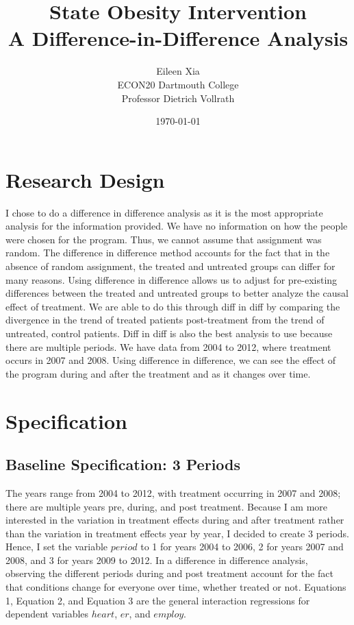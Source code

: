 \documentclass[a4paper]{article}
\title{State Obesity Intervention \\
A Difference-in-Difference Analysis}
\author{Eileen Xia \\ ECON20 Dartmouth College \\ Professor Dietrich Vollrath}
\date{\today}
\begin{document}
\maketitle

\section{Research Design}
I chose to do a difference in difference analysis as it is the most appropriate analysis for the information provided. We have no information on how the people were chosen for the program. Thus, we cannot assume that assignment was random. The difference in difference method accounts for the fact that in the absence of random assignment, the treated and untreated groups can differ for many reasons. Using difference in difference allows us to adjust for pre-existing differences between the treated and untreated groups to better analyze the causal effect of treatment. We are able to do this through diff in diff by comparing the divergence in the trend of treated patients post-treatment from the trend of untreated, control patients. Diff in diff is also the best analysis to use because there are multiple periods. We have data from 2004 to 2012, where treatment occurs in 2007 and 2008. Using difference in difference, we can see the effect of the program during and after the treatment and as it changes over time.

\section{Specification}

\subsection{Baseline Specification: 3 Periods}

The years range from 2004 to 2012, with treatment occurring in 2007 and 2008; there are multiple years pre, during, and post treatment. Because I am more interested in the variation in treatment effects during and after treatment rather than the variation in treatment effects year by year, I decided to create 3 periods. Hence, I set the variable \(period\) to 1 for years 2004 to 2006, 2 for years 2007 and 2008, and 3 for years 2009 to 2012. In a difference in difference analysis, observing the different periods during and post treatment account for the fact that conditions change for everyone over time, whether treated or not. Equations 1, Equation 2, and Equation 3 are the general interaction regressions for dependent variables \(heart\), \(er\), and \(employ\).
\end{document}
